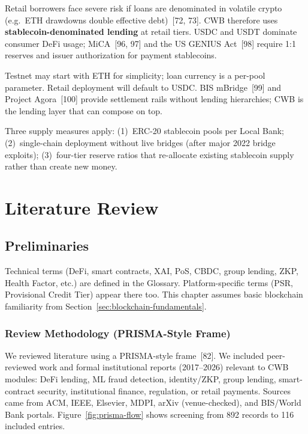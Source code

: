 \documentclass[12pt,a4paper]{report}
\begin{document}
Retail borrowers face severe risk if loans are denominated in volatile crypto (e.g.\ ETH drawdowns double effective debt)~[72, 73]. CWB therefore uses \textbf{stablecoin-denominated lending} at retail tiers. USDC and USDT dominate consumer DeFi usage; MiCA~[96, 97] and the US GENIUS Act~[98] require 1:1 reserves and issuer authorization for payment stablecoins.

Testnet may start with ETH for simplicity; loan currency is a per-pool parameter. Retail deployment will default to USDC. BIS mBridge~[99] and Project Agora~[100] provide settlement rails without lending hierarchies; CWB is the lending layer that can compose on top.

Three supply measures apply: (1)~ERC-20 stablecoin pools per Local Bank; (2)~single-chain deployment without live bridges (after major 2022 bridge exploits); (3)~four-tier reserve ratios that re-allocate existing stablecoin supply rather than create new money.


\chapter{Literature Review}

\section{Preliminaries}

Technical terms (DeFi, smart contracts, XAI, PoS, CBDC, group lending, ZKP, Health Factor, etc.) are defined in the Glossary. Platform-specific terms (PSR, Provisional Credit Tier) appear there too. This chapter assumes basic blockchain familiarity from Section~\ref{sec:blockchain-fundamentals}.

\subsection{Review Methodology (PRISMA-Style Frame)}
\label{sec:lit-prisma}

We reviewed literature using a PRISMA-style frame~[82]. We included peer-reviewed work and formal institutional reports (2017--2026) relevant to CWB modules: DeFi lending, ML fraud detection, identity/ZKP, group lending, smart-contract security, institutional finance, regulation, or retail payments. Sources came from ACM, IEEE, Elsevier, MDPI, arXiv (venue-checked), and BIS/World Bank portals. Figure~\ref{fig:prisma-flow} shows screening from 892 records to 116 included entries.
\end{document}
